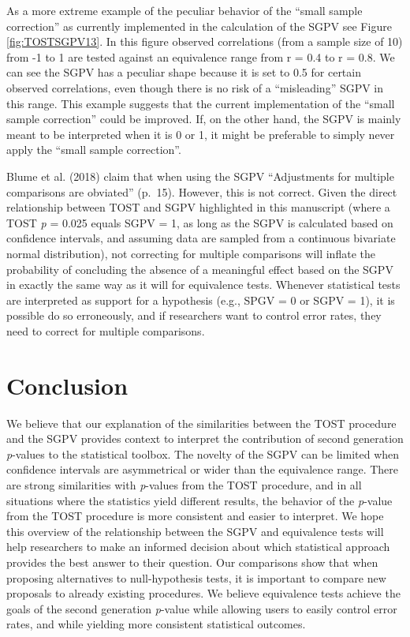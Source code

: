 \documentclass[,man,floatsintext]{apa6}
\begin{document}
As a more extreme example of the peculiar behavior of the \enquote{small sample correction} as currently implemented in the calculation of the SGPV see Figure \ref{fig:TOSTSGPV13}. In this figure observed correlations (from a sample size of 10) from -1 to 1 are tested against an equivalence range from r = 0.4 to r = 0.8. We can see the SGPV has a peculiar shape because it is set to 0.5 for certain observed correlations, even though there is no risk of a \enquote{misleading} SGPV in this range. This example suggests that the current implementation of the \enquote{small sample correction} could be improved. If, on the other hand, the SGPV is mainly meant to be interpreted when it is 0 or 1, it might be preferable to simply never apply the \enquote{small sample correction}.

Blume et al. (2018) claim that when using the SGPV \enquote{Adjustments for multiple comparisons are obviated} (p.~15). However, this is not correct. Given the direct relationship between TOST and SGPV highlighted in this manuscript (where a TOST \emph{p} = 0.025 equals SGPV = 1, as long as the SGPV is calculated based on confidence intervals, and assuming data are sampled from a continuous bivariate normal distribution), not correcting for multiple comparisons will inflate the probability of concluding the absence of a meaningful effect based on the SGPV in exactly the same way as it will for equivalence tests. Whenever statistical tests are interpreted as support for a hypothesis (e.g., SPGV = 0 or SGPV = 1), it is possible do so erroneously, and if researchers want to control error rates, they need to correct for multiple comparisons.

\hypertarget{conclusion}{%
\section{Conclusion}\label{conclusion}}

We believe that our explanation of the similarities between the TOST procedure and the SGPV provides context to interpret the contribution of second generation \emph{p}-values to the statistical toolbox. The novelty of the SGPV can be limited when confidence intervals are asymmetrical or wider than the equivalence range. There are strong similarities with \emph{p}-values from the TOST procedure, and in all situations where the statistics yield different results, the behavior of the \emph{p}-value from the TOST procedure is more consistent and easier to interpret. We hope this overview of the relationship between the SGPV and equivalence tests will help researchers to make an informed decision about which statistical approach provides the best answer to their question. Our comparisons show that when proposing alternatives to null-hypothesis tests, it is important to compare new proposals to already existing procedures. We believe equivalence tests achieve the goals of the second generation \emph{p}-value while allowing users to easily control error rates, and while yielding more consistent statistical outcomes.
\end{document}
